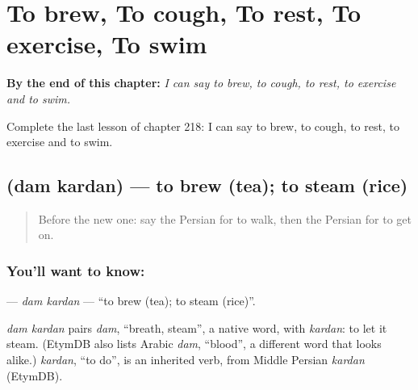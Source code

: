 
\chapter{To brew, To cough, To rest, To exercise, To swim}
\label{ch:fa-to-brew-to-cough-to-rest-to-exercise-to-swim}

\begin{chapteropening}
\textbf{By the end of this chapter:} \emph{I can say to brew, to cough, to rest, to exercise and to swim.}

Complete the last lesson of chapter 218: I can say to brew, to cough, to rest, to exercise and to swim.
\end{chapteropening}

\section[\texorpdfstring{\fa{دم} \fa{کردن} (dam kardan)}{دم کردن (dam kardan)}]{  (dam kardan) — to brew (tea); to steam (rice)}

\label{lesson:FA-C218-dam-kardan}



\begin{quote}
Before the new one: say the Persian for to walk, then the Persian for to get on.
\end{quote}

\subsection*{You'll want to know:  }
\textbf{ } — \emph{dam kardan} — \textquotedblleft{}to brew (tea); to steam (rice)\textquotedblright{}.

\begin{cousinweb}
\emph{dam kardan} pairs \emph{dam}, \textquotedblleft{}breath, steam\textquotedblright{}, a native word, with \emph{kardan}: to let it steam. (EtymDB also lists Arabic \emph{dam}, \textquotedblleft{}blood\textquotedblright{}, a different word that looks alike.) \emph{kardan}, \textquotedblleft{}to do\textquotedblright{}, is an inherited verb, from Middle Persian \emph{kardan} (EtymDB).
\end{cousinweb}


